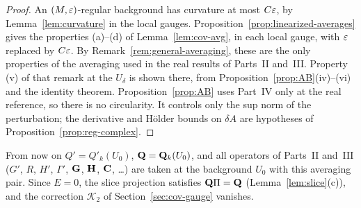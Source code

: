 \begin{proof}
An $(M,\varepsilon)$-regular background has curvature at most $C\varepsilon$, by Lemma~\ref{lem:curvature} in the local gauges. Proposition~\ref{prop:linearized-averages} gives the properties (a)--(d) of Lemma~\ref{lem:cov-avg}, in each local gauge, with $\varepsilon$ replaced by $C\varepsilon$. By Remark~\ref{rem:general-averaging}, these are the only properties of the averaging used in the real results of Parts~II and~III. Property (v) of that remark at the $U_\delta$ is shown there, from Proposition~\ref{prop:AB}(iv)--(vi) and the identity theorem. Proposition~\ref{prop:AB} uses Part~IV only at the real reference, so there is no circularity. It controls only the sup norm of the perturbation; the derivative and H\"older bounds on $\delta\!A$ are hypotheses of Proposition~\ref{prop:reg-complex}.
\end{proof}

From now on $Q'=Q'_k(U_0)$, $\mathbf Q=\mathbf Q_k(U_0)$, and all operators of Parts~II and~III ($G'$, $R$, $H'$, $\Gamma'$, $\mathbf G$, $\mathbf H$, $\mathbf C$, \dots) are taken at the background $U_0$ with this averaging pair. Since $E=0$, the slice projection satisfies $\mathbf Q\Pi=\mathbf Q$ (Lemma~\ref{lem:slice}(c)), and the correction $\mathcal K_2$ of Section~\ref{sec:cov-gauge} vanishes.
